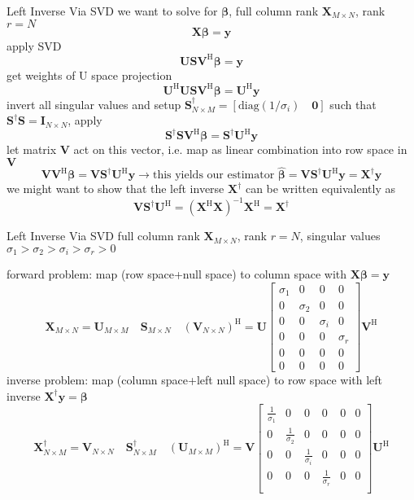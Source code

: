 \documentclass[mathserif, aspectratio=43]{intbeamer}
\begin{document}
\begin{frame}{Left Inverse Via SVD}
we want to solve for ${\bm{\beta}}$, full column rank $\bm{X}_{M \times N}$, rank $r=N$
$$\bm{X} {\bm{\beta}} = \bm{y}$$
apply SVD
$$\bm{U} \bm{S} \bm{V}^\mathrm{H} {\bm{\beta}} = \bm{y}$$
get weights of U space projection
$$\bm{U}^\mathrm{H} \bm{U} \bm{S} \bm{V}^\mathrm{H} {\bm{\beta}} = \bm{U}^\mathrm{H}\bm{y}$$
invert all singular values and setup $\bm{S}^\dagger_{N \times M} = [\mathrm{diag}(1/\sigma_i) \quad \bm{0}]$ such that
$\bm{S}^\dagger\bm{S} = \bm{I}_{N \times N}$, apply
$$\bm{S}^\dagger\bm{S} \bm{V}^\mathrm{H} {\bm{\beta}} = \bm{S}^\dagger\bm{U}^\mathrm{H}\bm{y}$$
let matrix $\bm{V}$ act on this vector, i.e. map as linear combination into row space in $\bm{V}$
$$\bm{V} \bm{V}^\mathrm{H} {\bm{\beta}} = \bm{V} \bm{S}^\dagger\bm{U}^\mathrm{H}\bm{y}
\rightarrow \text{this yields our estimator } \hat{\bm{\beta}} = \bm{V} \bm{S}^\dagger\bm{U}^\mathrm{H}\bm{y} = \bm{X}^\dagger \bm{y}$$
we might want to show that the left inverse $\bm{X}^\dagger$ can be written equivalently as
$$\bm{V} \bm{S}^\dagger\bm{U}^\mathrm{H} = (\bm{X}^\mathrm{H}\bm{X})^{-1} \bm{X}^\mathrm{H} = \bm{X}^\dagger$$
\end{frame}



\begin{frame}{Left Inverse Via SVD}
full column rank $\bm{X}_{M \times N}$, rank $r=N$, singular values $\sigma_1 > \sigma_2 > \sigma_i > \sigma_r > 0$

forward problem: map (row space+null space) to column space with $\bm{X} \bm{\beta} = \bm{y}$
$$
\bm{X}_{M \times N}
=
\bm{U}_{M \times M}\quad
\bm{S}_{M \times N}\quad
(\bm{V}_{N \times N})^\mathrm{H}=
\bm{U}
\begin{bmatrix}
\sigma_1  & 0  & 0 & 0\\
0 & \sigma_2 & 0 & 0\\
0 & 0 & \sigma_i & 0\\
0 & 0 & 0 & \sigma_r\\
0 & 0 & 0 & 0\\
0 & 0 & 0 & 0
\end{bmatrix}
\bm{V}^\mathrm{H}
$$
inverse problem: map (column space+left null space) to row space with left inverse $\bm{X}^\dagger \bm{y} = \bm{\beta}$
$$
\bm{X}^\dagger_{N \times M}
=
\bm{V}_{N \times N}\quad
\bm{S}^\dagger_{N \times M}\quad
(\bm{U}_{M \times M})^\mathrm{H}
=
\bm{V}
\begin{bmatrix}
\frac{1}{\sigma_1} & 0 & 0 & 0 & 0 & 0\\
0 & \frac{1}{\sigma_2} & 0 & 0 & 0 & 0\\
0 & 0 & \frac{1}{\sigma_i} & 0 & 0 & 0\\
0 & 0 & 0 & \frac{1}{\sigma_r} & 0 & 0\\
\end{bmatrix}
\bm{U}^\mathrm{H}
$$






\end{frame}
\end{document}

